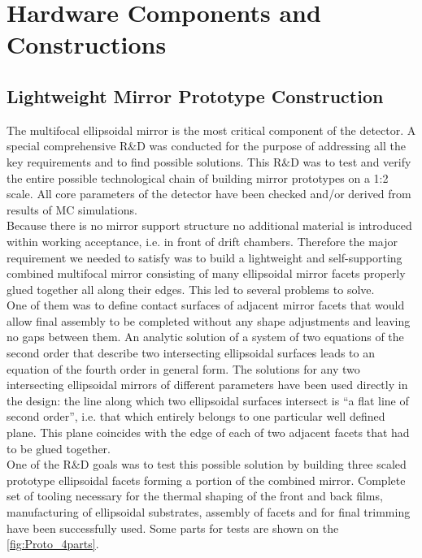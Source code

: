 \section{Hardware Components and Constructions}
\subsection{Lightweight Mirror Prototype Construction}
The multifocal ellipsoidal mirror is the most critical component of the detector. A special comprehensive R$\&$D was conducted for the purpose of addressing all the key requirements and to find possible solutions. This R$\&$D was to test and verify the entire possible technological chain of building mirror prototypes on a 1:2 scale. All core parameters of the detector have been checked and/or derived from results of MC simulations. \\
\indent Because there is no mirror support structure no additional material is introduced  within working acceptance, i.e. in front of drift chambers. Therefore the major requirement we needed to satisfy was to build a lightweight and self-supporting combined multifocal mirror consisting of many ellipsoidal mirror facets properly glued together all along their edges. This led to several problems to solve. \\
\indent One of them was to define contact surfaces of adjacent mirror facets that would allow final assembly to be completed without any shape adjustments and leaving no gaps between them. An analytic solution of a system of two equations of the second order that describe two intersecting ellipsoidal surfaces leads to an equation of the fourth order in general form. The solutions for any two intersecting ellipsoidal mirrors of different parameters have been used directly in the design: the line along which two ellipsoidal surfaces intersect is “a flat line of second order”, i.e. that which entirely belongs to one particular well defined plane. This plane coincides with the edge of each of two adjacent facets that had to be glued together.  
\\
\indent One of the R$\&$D goals was to test this possible solution by building three scaled prototype ellipsoidal facets forming a portion of the combined mirror. Complete set of tooling necessary for the thermal shaping of the front and back films, manufacturing of ellipsoidal substrates, assembly of facets and for final trimming have been successfully used. Some parts for tests are shown on the \ref{fig:Proto_4parts}.
